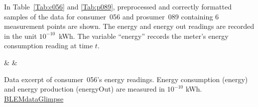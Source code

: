 In Table~\ref{Tab:c056} and \ref{Tab:p089}, preprocessed and correctly formatted samples of the data for consumer~056 and prosumer~089 containing 6 measurement points are shown. The energy and energy out readings are recorded in the unit $10^{-10}$~kWh. The variable ``energy'' records the meter's energy consumption reading at time $t$.
%
\begin{table}[htbp]
    {\csvcolii & \csvcoliii & \csvcoliv}%
    \caption[Data excerpt of consumer~056's energy readings]{Data excerpt of consumer~056's energy readings. Energy consumption (energy) and energy production (energyOut) are measured in $10^{-10}$ kWh. \quantnet\href{https://github.com/QuantLet/BLEM/tree/master/BLEMdataGlimpse}{BLEMdataGlimpse}}
    \label{Tab:c056}
\end{table}
%

